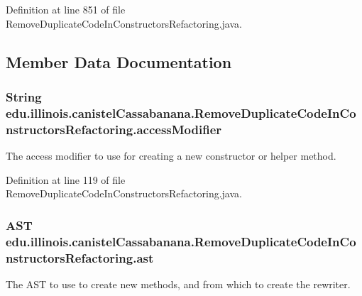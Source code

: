 Definition at line 851 of file RemoveDuplicateCodeInConstructorsRefactoring.java.



\subsection{Member Data Documentation}
\hypertarget{classedu_1_1illinois_1_1canistelCassabanana_1_1RemoveDuplicateCodeInConstructorsRefactoring_ac98e605acbaebe4c90d19de7baae3798}{
\subsubsection[{accessModifier}]{\setlength{\rightskip}{0pt plus 5cm}String {\bf edu.illinois.canistelCassabanana.RemoveDuplicateCodeInConstructorsRefactoring.accessModifier}}}
\label{classedu_1_1illinois_1_1canistelCassabanana_1_1RemoveDuplicateCodeInConstructorsRefactoring_ac98e605acbaebe4c90d19de7baae3798}
The access modifier to use for creating a new constructor or helper method. 

Definition at line 119 of file RemoveDuplicateCodeInConstructorsRefactoring.java.

\hypertarget{classedu_1_1illinois_1_1canistelCassabanana_1_1RemoveDuplicateCodeInConstructorsRefactoring_ab3b3926a515821596ed383f908c322c1}{
\subsubsection[{ast}]{\setlength{\rightskip}{0pt plus 5cm}AST {\bf edu.illinois.canistelCassabanana.RemoveDuplicateCodeInConstructorsRefactoring.ast}}}
\label{classedu_1_1illinois_1_1canistelCassabanana_1_1RemoveDuplicateCodeInConstructorsRefactoring_ab3b3926a515821596ed383f908c322c1}
The AST to use to create new methods, and from which to create the rewriter. 

